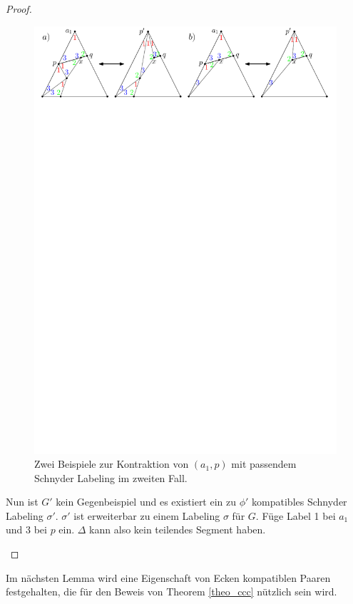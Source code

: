\begin{proof}
\begin{description}[leftmargin =0pt, font = \rmfamily,listparindent=\parindent,parsep=0pt]
\begin{figure}
	\centering
	  \includegraphics[width=1\textwidth]{lem3_2.pdf}
    	\caption{Zwei Beispiele zur Kontraktion von $(a_1,p)$ mit passendem Schnyder Labeling im zweiten Fall.}
    	\label{pic_lem3_2}
\end{figure}

Nun ist $G'$ kein Gegenbeispiel und es existiert ein zu $\phi'$ kompatibles Schnyder Labeling $\sigma'$. $\sigma'$ ist erweiterbar zu einem Labeling $\sigma$ für $G$. Füge Label 1 bei $a_1$ und 3 bei $p$ ein. $\Delta$ kann also kein teilendes Segment haben.
\end{description}
\end{proof}

Im nächsten Lemma wird eine Eigenschaft von Ecken kompatiblen Paaren festgehalten, die für den Beweis von Theorem \ref{theo_ccc} nützlich sein wird.

